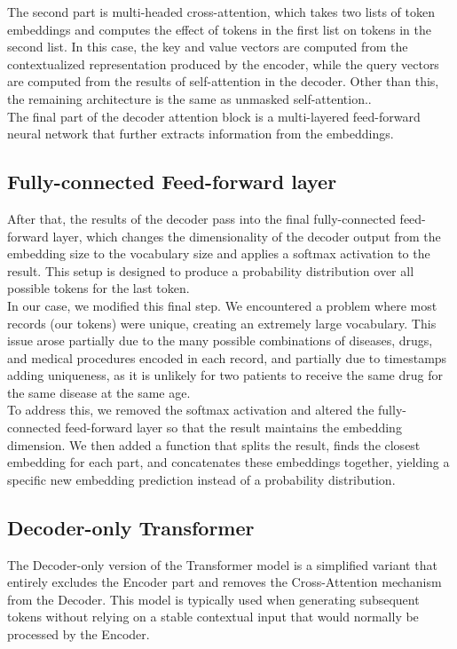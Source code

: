 The second part is multi-headed cross-attention, which takes two lists of token embeddings and computes the effect of tokens in the first list on tokens in the second list. In this case, the key and value vectors are computed from the contextualized representation produced by the encoder, while the query vectors are computed from the results of self-attention in the decoder. Other than this, the remaining architecture is the same as unmasked self-attention.. 
\\

The final part of the decoder attention block is a multi-layered feed-forward neural network that further extracts information from the embeddings.

\subsection{Fully-connected Feed-forward layer}

After that, the results of the decoder pass into the final fully-connected feed-forward layer, which changes the dimensionality of the decoder output from the embedding size to the vocabulary size and applies a softmax activation to the result. This setup is designed to produce a probability distribution over all possible tokens for the last token.
\\

In our case, we modified this final step. We encountered a problem where most records (our tokens) were unique, creating an extremely large vocabulary. This issue arose partially due to the many possible combinations of diseases, drugs, and medical procedures encoded in each record, and partially due to timestamps adding uniqueness, as it is unlikely for two patients to receive the same drug for the same disease at the same age.
\\

To address this, we removed the softmax activation and altered the fully-connected feed-forward layer so that the result maintains the embedding dimension. We then added a function that splits the result, finds the closest embedding for each part, and concatenates these embeddings together, yielding a specific new embedding prediction instead of a probability distribution.

\subsection{Decoder-only Transformer}

The Decoder-only version of the Transformer model is a simplified variant that entirely excludes the Encoder part and removes the Cross-Attention mechanism from the Decoder. This model is typically used when generating subsequent tokens without relying on a stable contextual input that would normally be processed by the Encoder.
\\


